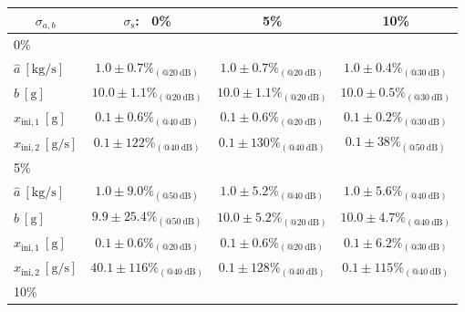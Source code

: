 {{\begin{table}[h!]
\begin{tabular}{c| c c c} 
\hline  
$\sigma_{{a},{b}}$ & $\sigma_{\mathrm{s}}$: \ 0\% & 5\% & 10\% \\ [0.5ex] 
\hline
 \multicolumn{1}{l|}{0\%} \\
 \multicolumn{1}{l|}{\hspace{2mm} $\widehat{a} \ \mathrm{[kg/s]}$} & $1.0 \pm 0.7 \%_{(@20 \ \mathrm{dB})}$ &  $1.0 \pm 0.7 \%_{(@20 \ \mathrm{dB})}$ & $1.0 \pm 0.4 \%_{(@30 \ \mathrm{dB})}$ \\ 
 \multicolumn{1}{l|}{\hspace{2mm} $\widehat{b} \ \mathrm{[g]}$} & $10.0 \pm 1.1 \%_{(@20 \ \mathrm{dB})}$ & $10.0 \pm 1.1 \%_{(@20 \ \mathrm{dB})}$ & $10.0 \pm 0.5 \%_{(@30 \ \mathrm{dB})}$ \\ 
 \multicolumn{1}{l|}{\hspace{2mm} $\widehat{x}_{\mathrm{ini,1}} \ \mathrm{[g]}$} & $0.1 \pm 0.6 \%_{(@40 \ \mathrm{dB})}$ & $0.1 \pm 0.6 \%_{(@20 \ \mathrm{dB})}$ & $0.1 \pm 0.2 \%_{(@30 \ \mathrm{dB})}$ \\
 \multicolumn{1}{l|}{\hspace{2mm} $\widehat{x}_{\mathrm{ini,2}} \ \mathrm{[g/s]}$} & $0.1 \pm 122 \%_{(@40 \ \mathrm{dB})}$ & $0.1 \pm 130 \%_{(@40 \ \mathrm{dB})}$ & $0.1 \pm 38 \%_{(@50 \ \mathrm{dB})}$ \\
 \multicolumn{1}{l|}{5\%} \\
 \multicolumn{1}{l|}{\hspace{2mm} $\widehat{a} \ \mathrm{[kg/s]}$} & $1.0 \pm 9.0 \%_{(@50 \ \mathrm{dB})}$ & $1.0 \pm 5.2 \%_{(@40 \ \mathrm{dB})}$ & $1.0 \pm 5.6 \%_{(@40 \ \mathrm{dB})}$ \\  
 \multicolumn{1}{l|}{\hspace{2mm} $\widehat{b} \ \mathrm{[g]}$} & $9.9 \pm 25.4 \%_{(@50 \ \mathrm{dB})}$ & $10.0 \pm 5.2 \%_{(@20 \ \mathrm{dB})}$ & $10.0 \pm 4.7 \%_{(@40 \ \mathrm{dB})}$ \\ 
\multicolumn{1}{l|}{\hspace{2mm} $\widehat{x}_{\mathrm{ini,1}} \ \mathrm{[g]}$} & $0.1 \pm 0.6 \%_{(@20 \ \mathrm{dB})}$ & $0.1 \pm 0.6 \%_{(@20 \ \mathrm{dB})}$ & $0.1 \pm 6.2 \%_{(@30 \ \mathrm{dB})}$ \\
 \multicolumn{1}{l|}{\hspace{2mm} $\widehat{x}_{\mathrm{ini,2}} \ \mathrm{[g/s]}$} & $40.1 \pm 116 \%_{(@40 \ \mathrm{dB})}$ & $0.1 \pm 128 \%_{(@40 \ \mathrm{dB})}$ & $0.1 \pm 115 \%_{(@40 \ \mathrm{dB})}$ \\
 \multicolumn{1}{l|}{10\%} \\

\end{tabular}
\end{table}}}
